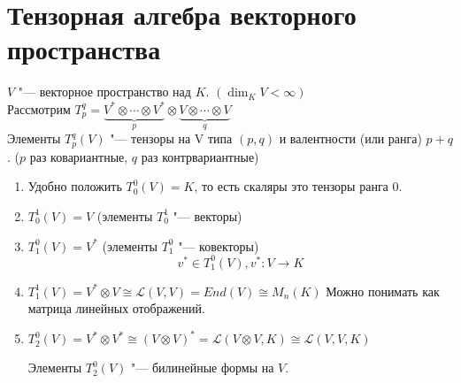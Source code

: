 ﻿
\section{Тензорная алгебра векторного пространства}
\begin{Def}
$V$ "--- векторное пространство над $K$. $(\dim_{K}V < \infty)$\\
Рассмотрим $T_p^q = \underbrace{V^*\otimes \cdots \otimes V^*}_{p} \otimes \underbrace{V \otimes \cdots \otimes V}_{q}$\\
Элементы $T_{p}^q(V)$ "--- тензоры на V типа $(p, q)$ и валентности (или ранга) $p + q$. ($p$ раз ковариантные, $q$ раз контрвариантные)
\end{Def}
\begin{exmp}
\begin{enumerate}
\item Удобно положить $T_0^0(V)= K$, то есть скаляры это тензоры ранга 0.
\item $T_0^1(V) = V$ (элементы $T_0^1$ "--- векторы)
\item $T_1^0(V) = V^*$ (элементы $T_1^0$ "--- ковекторы)\\
$$v^* \in T_1^0(V), v^* \colon V \to K$$
\item 
$T_1^1(V) = V^* \otimes V \cong \mathcal{L}(V, V) = End(V) \cong M_n(K)$
Можно понимать как матрица линейных отображений. 
\item
$T_2^0(V) = V^*\otimes V^* \cong (V \otimes V)^* = \mathcal{L}(V \otimes V, K) \cong \mathcal{L}(V, V, K)$ 

Элементы $T_2^0(V)$ "--- билинейные формы на $V$.
\end{enumerate}
\end{exmp}

